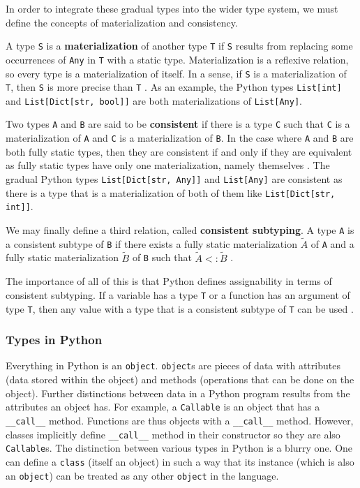 \documentclass[10pt,twocolumn]{article}
\begin{document}
In order to integrate these gradual types into the wider type system, we must define the concepts of materialization and consistency. 

A type \verb|S| is a \textbf{materialization} of another type \verb|T| if \verb|S| results from replacing some occurrences of \verb|Any| in \verb|T| with a static type. Materialization is a reflexive relation, so every type is a materialization of itself. In a sense, if \verb|S| is a materialization of \verb|T|, then \verb|S| is more precise than \verb|T| \cite{castagna_gradual_2019}. As an example, the Python types \verb|List[int]| and \verb|List[Dict[str, bool]]| are both materializations of \verb|List[Any]|. 

Two types \verb|A| and \verb|B| are said to be \textbf{consistent} if there is a type \verb|C| such that \verb|C| is a materialization of \verb|A| and \verb|C| is a materialization of \verb|B|. In the case where \verb|A| and \verb|B| are both fully static types, then they are consistent if and only if they are equivalent as fully static types have only one materialization, namely themselves \cite{garcia2016abstracting}. The gradual Python types \verb|List[Dict[str, Any]]| and \verb|List[Any]| are consistent as there is a type that is a materialization of both of them like \verb|List[Dict[str, int]]|.

We may finally define a third relation, called \textbf{consistent subtyping}. A type \verb|A| is a consistent subtype of \verb|B| if there exists a fully static materialization $\widetilde{A}$ of \verb|A| and a fully static materialization $\widetilde{B}$ of \verb|B| such that $\widetilde{A} <: \widetilde{B}$ \cite{garcia2016abstracting}.

The importance of all of this is that Python defines assignability in terms of consistent subtyping. If a variable has a type \verb|T| or a function has an argument of type \verb|T|, then any value with a type that is a consistent subtype of \verb|T| can be used \cite{pythontypespec}. 

\subsubsection{Types in Python}

Everything in Python is an \verb|object|. \verb|object|s are pieces of data with attributes (data stored within the object) and methods (operations that can be done on the object). Further distinctions between data in a Python program results from the attributes an object has. For example, a \verb|Callable| is an object that has a \verb|__call__| method. Functions are thus objects with a \verb|__call__| method. However, classes implicitly define \verb|__call__| method in their constructor so they are also \verb|Callable|s. The distinction between various types in Python is a blurry one. One can define a \verb|class| (itself an object) in such a way that its instance (which is also an \verb|object|) can be treated as any other \verb|object| in the language. 
\end{document}
